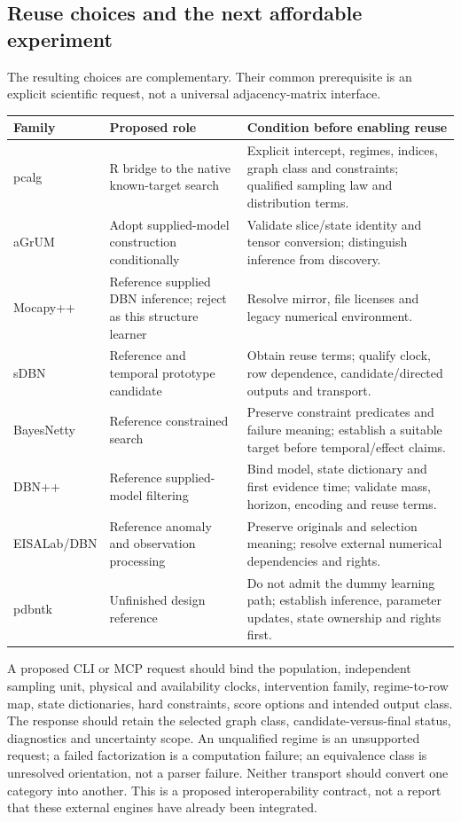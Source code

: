 \subsection{Reuse choices and the next affordable experiment}

The resulting choices are complementary. Their common prerequisite is an
explicit scientific request, not a universal adjacency-matrix interface.

\begin{longtable}{P{0.15\textwidth}P{0.34\textwidth}P{0.43\textwidth}}
\toprule
Family & Proposed role & Condition before enabling reuse\\
\midrule
\endhead
pcalg & R bridge to the native known-target search & Explicit intercept, regimes,
indices, graph class and constraints; qualified sampling law and distribution terms.\\
aGrUM & Adopt supplied-model construction conditionally & Validate slice/state
identity and tensor conversion; distinguish inference from discovery.\\
Mocapy++ & Reference supplied DBN inference; reject as this structure learner &
Resolve mirror, file licenses and legacy numerical environment.\\
sDBN & Reference and temporal prototype candidate & Obtain reuse terms; qualify
clock, row dependence, candidate/directed outputs and transport.\\
BayesNetty & Reference constrained search & Preserve constraint predicates and
failure meaning; establish a suitable target before temporal/effect claims.\\
DBN++ & Reference supplied-model filtering & Bind model, state dictionary and first evidence time; validate mass, horizon, encoding and reuse terms.\\
EISALab/DBN & Reference anomaly and observation processing & Preserve originals and selection meaning; resolve external numerical dependencies and rights.\\
pdbntk & Unfinished design reference & Do not admit the dummy learning path; establish inference, parameter updates, state ownership and rights first.\\
\bottomrule
\end{longtable}

A proposed CLI or MCP request should bind the population, independent sampling
unit, physical and availability clocks, intervention family, regime-to-row map,
state dictionaries, hard constraints, score options and intended output class.
The response should retain the selected graph class, candidate-versus-final
status, diagnostics and uncertainty scope. An unqualified regime is an
unsupported request; a failed factorization is a computation failure; an
equivalence class is unresolved orientation, not a parser failure. Neither
transport should convert one category into another. This is a proposed
interoperability contract, not a report that these external engines have
already been integrated. \citep{exec16_ct_design}

